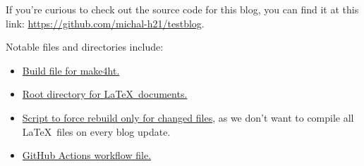 \documentclass{article}
\begin{document}
If you’re curious to check out the source code for this blog, you can find it at this link:
\url{https://github.com/michal-h21/testblog}.

Notable files and directories include:

\begin{itemize}
  \item \href{https://github.com/michal-h21/testblog/blob/main/.make4ht}{Build file for make4ht.}
  \item \href{https://github.com/michal-h21/testblog/tree/main/texposts}{Root directory for \LaTeX\ documents.}
  \item \href{https://github.com/michal-h21/testblog/blob/main/texposts/rebuild.sh}{Script to force rebuild only for changed files},
    as we don't want to compile all \LaTeX\ files on every blog update.
  \item \href{https://github.com/michal-h21/testblog/blob/main/.github/workflows/main.yml}{GitHub Actions workflow file.}
\end{itemize}
\end{document}
